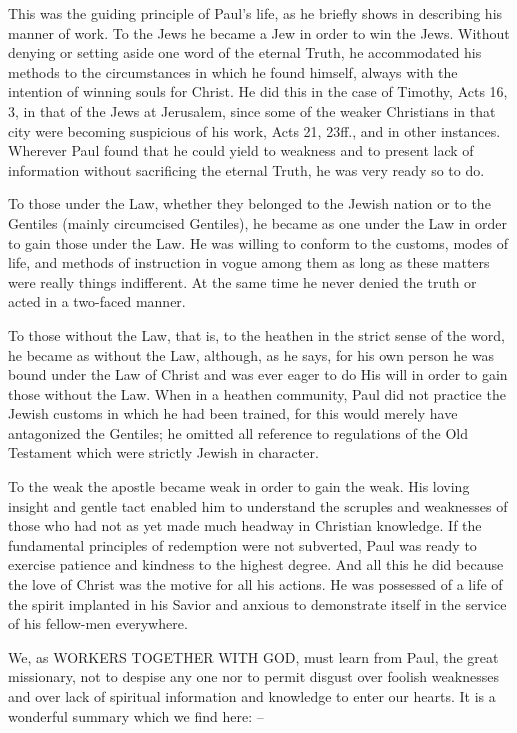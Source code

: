 \documentclass[
]{book}
\begin{document}
This was the guiding principle of Paul's life, as he briefly shows in describing his manner of work. To the Jews he became a Jew in order to win the Jews. Without denying or setting aside one word of the eternal Truth, he accommodated his methods to the circumstances in which he found himself, always with the intention of winning souls for Christ. He did this in the case of Timothy, Acts 16, 3, in that of the Jews at Jerusalem, since some of the weaker Christians in that city were becoming suspicious of his work, Acts 21, 23ff., and in other instances. Wherever Paul found that he could yield to weakness and to present lack of information without sacrificing the eternal Truth, he was very ready so to do.

To those under the Law, whether they belonged to the Jewish nation or to the Gentiles (mainly circumcised Gentiles), he became as one under the Law in order to gain those under the Law. He was willing to conform to the customs, modes of life, and methods of instruction in vogue among them as long as these matters were really things indifferent. At the same time he never denied the truth or acted in a two-faced manner.

To those without the Law, that is, to the heathen in the strict sense of the word, he became as without the Law, although, as he says, for his own person he was bound under the Law of Christ and was ever eager to do His will in order to gain those without the Law. When in a heathen community, Paul did not practice the Jewish customs in which he had been trained, for this would merely have antagonized the Gentiles; he omitted all reference to regulations of the Old Testament which were strictly Jewish in character.

To the weak the apostle became weak in order to gain the weak. His loving insight and gentle tact enabled him to understand the scruples and weaknesses of those who had not as yet made much headway in Christian knowledge. If the fundamental principles of redemption were not subverted, Paul was ready to exercise patience and kindness to the highest degree. And all this he did because the love of Christ was the motive for all his actions. He was possessed of a life of the spirit implanted in his Savior and anxious to demonstrate itself in the service of his fellow-men everywhere.

We, as WORKERS TOGETHER WITH GOD, must learn from Paul, the great missionary, not to despise any one nor to permit disgust over foolish weaknesses and over lack of spiritual information and knowledge to enter our hearts. It is a wonderful summary which we find here: --
\end{document}
